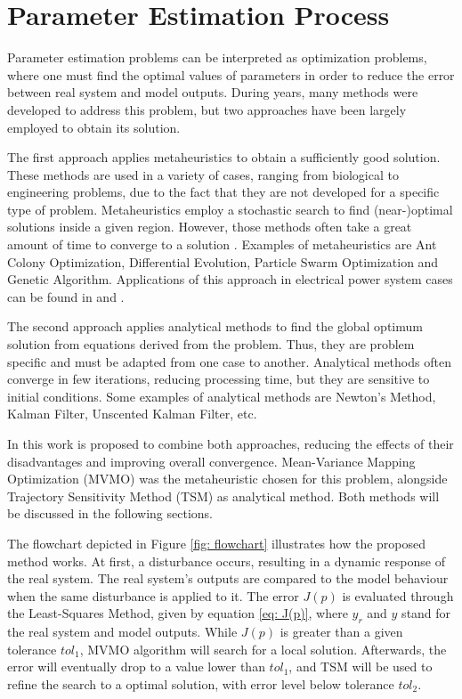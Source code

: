 \chapter{Parameter Estimation Process}

\label{ch: Estim}

Parameter estimation problems can be interpreted as optimization problems, where one must find the optimal values of parameters in order to reduce the error between real system and model outputs. During years, many methods were developed to address this problem, but two approaches have been largely employed to obtain its solution. 

The first approach applies metaheuristics to obtain a sufficiently good solution. These methods are used in a variety of cases, ranging from biological to engineering problems, due to the fact that they are not developed for a specific type of problem. Metaheuristics employ a stochastic search to find (near-)optimal solutions inside a given region. However, those methods often take a great amount of time to converge to a solution \cite{Blum2003}. Examples of metaheuristics are Ant Colony Optimization, Differential Evolution, Particle Swarm Optimization and Genetic Algorithm. Applications of this approach in electrical power system cases can be found in \cite{Todorovski2006} and \cite{Yoshida2000}.

The second approach applies analytical methods to find the global optimum solution from equations derived from the problem. Thus, they are problem specific and must be adapted from one case to another. Analytical methods often converge in few iterations, reducing processing time, but they are sensitive to initial conditions. Some examples of analytical methods are Newton's Method, Kalman Filter, Unscented Kalman Filter, etc.

In this work is proposed to combine both approaches, reducing the effects of their disadvantages and improving overall convergence. Mean-Variance Mapping Optimization (MVMO) was the metaheuristic chosen for this problem, alongside Trajectory Sensitivity Method (TSM) as analytical method. Both methods will be discussed in the following sections.

The flowchart depicted in Figure \ref{fig: flowchart} illustrates how the proposed method works. At first, a disturbance occurs, resulting in a dynamic response of the real system. The real system's outputs are compared to the model behaviour when the same disturbance is applied to it. The error $J(p)$ is evaluated through the Least-Squares Method, given by equation \ref{eq: J(p)}, where $y_{r}$ and $y$ stand for the real system and model outputs. While $J(p)$ is greater than a given tolerance $tol_{1}$, MVMO algorithm will search for a local solution. Afterwards, the error will eventually drop to a value lower than $tol_{1}$, and TSM will be used to refine the search to a optimal solution, with error level below tolerance $tol_{2}$.

